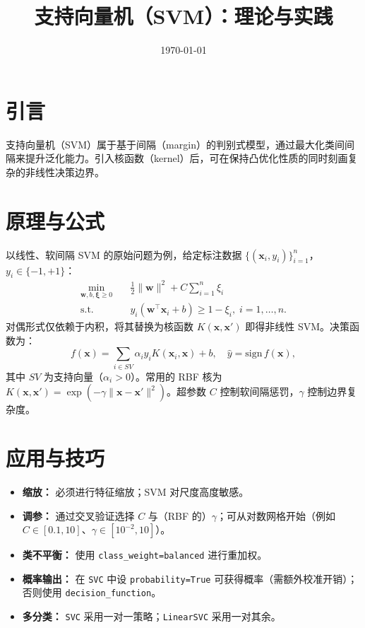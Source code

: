 \documentclass[UTF8,zihao=-4]{ctexart}
\title{支持向量机（SVM）：理论与实践}
\author{}
\date{\today}
\begin{document}
\maketitle


\section{引言}
支持向量机（SVM）属于基于间隔（margin）的判别式模型，通过最大化类间间隔来提升泛化能力。引入核函数（kernel）后，可在保持凸优化性质的同时刻画复杂的非线性决策边界。

\section{原理与公式}
以线性、软间隔 SVM 的原始问题为例，给定标注数据 $\{(\mathbf{x}_i, y_i)\}_{i=1}^n$，$y_i\in\{-1,+1\}$：
\begin{align}
\min_{\mathbf{w}, b, \boldsymbol{\xi} \ge 0} \quad & \tfrac{1}{2}\lVert \mathbf{w} \rVert^2 + C \sum_{i=1}^n \xi_i \\
\text{s.t.} \quad & y_i (\mathbf{w}^\top \mathbf{x}_i + b) \ge 1 - \xi_i,\; i=1,\dots,n.
\end{align}
对偶形式仅依赖于内积，将其替换为核函数 $K(\mathbf{x},\mathbf{x}')$ 即得非线性 SVM。决策函数为：
\begin{equation}
f(\mathbf{x}) = \sum_{i \in SV} \alpha_i y_i K(\mathbf{x}_i, \mathbf{x}) + b, \quad \hat{y} = \mathrm{sign}\, f(\mathbf{x}),
\end{equation}
其中 $SV$ 为支持向量（$\alpha_i>0$）。常用的 RBF 核为 $K(\mathbf{x},\mathbf{x}')=\exp(-\gamma\lVert\mathbf{x}-\mathbf{x}'\rVert^2)$。超参数 $C$ 控制软间隔惩罚，$\gamma$ 控制边界复杂度。

\section{应用与技巧}
\begin{itemize}
  \item \textbf{缩放：} 必须进行特征缩放；SVM 对尺度高度敏感。
  \item \textbf{调参：} 通过交叉验证选择 $C$ 与（RBF 的）$\gamma$；可从对数网格开始（例如 $C\in[0.1,10]$、$\gamma\in[10^{-2},10]$）。
  \item \textbf{类不平衡：} 使用 \texttt{class\_weight=balanced} 进行重加权。
  \item \textbf{概率输出：} 在 \texttt{SVC} 中设 \texttt{probability=True} 可获得概率（需额外校准开销）；否则使用 \texttt{decision\_function}。
  \item \textbf{多分类：} \texttt{SVC} 采用一对一策略；\texttt{LinearSVC} 采用一对其余。
\end{itemize}
\end{document}
